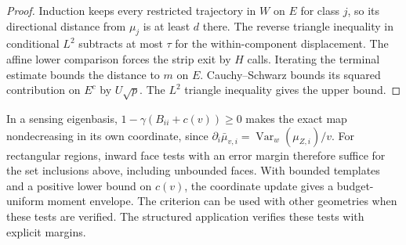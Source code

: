 \begin{proof}
Induction keeps every restricted trajectory in $W$ on $E$ for class
$j$, so its directional distance from $\mu_j$ is at least $d$ there.
The reverse triangle inequality in conditional $L^2$ subtracts at
most $\tau$ for the within-component displacement.
The affine lower comparison forces the strip exit by $H$ calls.
Iterating the terminal estimate bounds the distance to $m$ on $E$.
Cauchy--Schwarz bounds its squared contribution on $E^c$ by
$U\sqrt p$. The $L^2$ triangle inequality gives the upper bound.
\end{proof}

In a sensing eigenbasis, $1-\gamma(B_{ii}+c(v))\ge0$
makes the exact map nondecreasing in its own coordinate, since
$\partial_i\bar\mu_{v,i}=\operatorname{Var}_{w}(\mu_{Z,i})/v$.
For rectangular regions, inward face tests with an error margin
therefore suffice for the set inclusions above, including unbounded
faces. With bounded templates and a positive lower bound on $c(v)$,
the coordinate update gives a budget-uniform moment envelope.
The criterion can be used with other geometries when these tests
are verified. The structured application verifies these tests with explicit margins.
